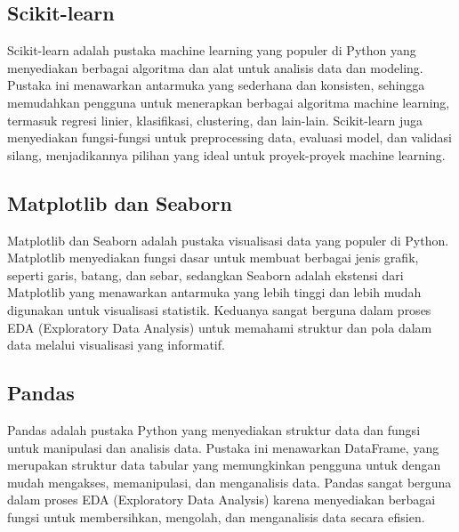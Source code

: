 \subsection{Scikit-learn}
Scikit-learn adalah pustaka machine learning yang populer di Python yang menyediakan berbagai algoritma dan alat untuk analisis data dan modeling. Pustaka ini menawarkan antarmuka yang sederhana dan konsisten, sehingga memudahkan pengguna untuk menerapkan berbagai algoritma machine learning, termasuk regresi linier, klasifikasi, clustering, dan lain-lain. Scikit-learn juga menyediakan fungsi-fungsi untuk preprocessing data, evaluasi model, dan validasi silang, menjadikannya pilihan yang ideal untuk proyek-proyek machine learning.

\subsection{Matplotlib dan Seaborn}

Matplotlib dan Seaborn adalah pustaka visualisasi data yang populer di Python. Matplotlib menyediakan fungsi dasar untuk membuat berbagai jenis grafik, seperti garis, batang, dan sebar, sedangkan Seaborn adalah ekstensi dari Matplotlib yang menawarkan antarmuka yang lebih tinggi dan lebih mudah digunakan untuk visualisasi statistik. Keduanya sangat berguna dalam proses EDA (Exploratory Data Analysis) untuk memahami struktur dan pola dalam data melalui visualisasi yang informatif.

\subsection{Pandas}

Pandas adalah pustaka Python yang menyediakan struktur data dan fungsi untuk manipulasi dan analisis data. Pustaka ini menawarkan DataFrame, yang merupakan struktur data tabular yang memungkinkan pengguna untuk dengan mudah mengakses, memanipulasi, dan menganalisis data. Pandas sangat berguna dalam proses EDA (Exploratory Data Analysis) karena menyediakan berbagai fungsi untuk membersihkan, mengolah, dan menganalisis data secara efisien.



\newpage